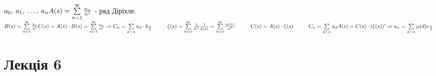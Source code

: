 \documentclass[a4paper,12pt, centered]{bookest}
\newcommand\tab[1][1cm]{\hspace*{#1}}
\begin{document}
\begin{example}
	$a_0,\>a_1,\>\dots,\>a_n\\ A(s)=\sum\limits_{n=1}^{\infty}\frac{a_n}{n^s}$ - ряд Діріхле.\tab $B(s)=\sum\limits_{n=1}^{\infty}\frac{b_n}{n^s}\\C(s)=A(s)\cdot B(s)=\sum\limits_{n=1}^{\infty}\frac{c_n}{n^s}\Rightarrow C_n=\sum\limits_{d\>|\>n}a_d\cdot b_{\frac nd}\tab\xi(s)=\sum\limits_{n=1}^{\infty}\frac1{n^S}\\ \frac1{\xi(s)}=\sum\limits_{n=1}^{\infty}\frac{\mu(n)}{n^S}\tab C(s)=A(s)\cdot\xi(s)\tab C_n=\sum\limits_{d\>|\>n	}a_d\\ A(s)=C(s)\cdot(\xi(s))'\Rightarrow a_n=\sum\limits_{d\>|\>n}\mu(d)c_{\frac nd}$
\end{example}
\let\cleardoublepage\clearpage
\chapter{Лекція 6}
\end{document}
